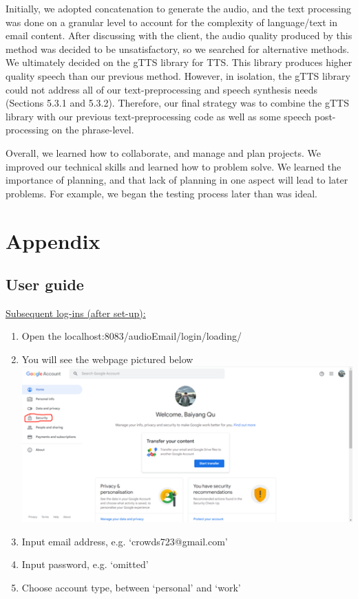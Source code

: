 \documentclass{article}
\begin{document}
Initially, we adopted concatenation to generate the audio, and the text processing was done on a granular level to account for the complexity of language/text in email content. After discussing with the client, the audio quality produced by this method was decided to be unsatisfactory, so we searched for alternative methods. We ultimately decided on the gTTS library for TTS. This library produces higher quality speech than our previous method. However, in isolation, the gTTS library could not address all of our text-preprocessing and speech synthesis needs (Sections 5.3.1 and 5.3.2). Therefore, our final strategy was to combine the gTTS library with our previous text-preprocessing code as well as some speech post-processing on the phrase-level. 

Overall, we learned how to collaborate, and manage and plan projects. We improved our technical skills and learned how to problem solve. We learned the importance of planning, and that lack of planning in one aspect will lead to later problems. For example, we began the testing process later than was ideal.

\newpage
\section{Appendix}

\subsection{User guide}

\underline{Subsequent log-ins (after set-up):}
\begin{enumerate}
  \item Open the localhost:8083/audioEmail/login/loading/
  \item You will see the webpage pictured below \\
  \includegraphics[]{google security.png} \\
  \item Input email address, e.g. ‘crowds723@gmail.com’
  \item Input password, e.g.  ‘omitted’
  \item Choose account type, between ‘personal’ and ‘work’
\end{enumerate}
\end{document}
